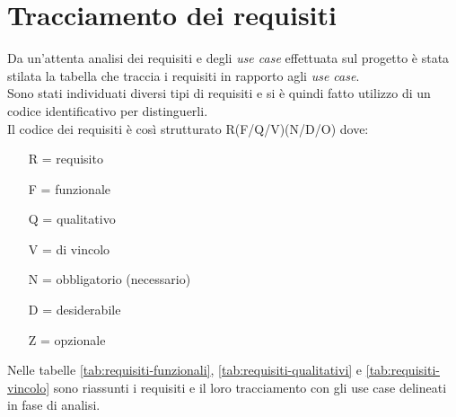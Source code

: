 \section{Tracciamento dei requisiti}
Da un'attenta analisi dei requisiti e degli \textit{use case} effettuata sul
progetto è
stata stilata la tabella che traccia i requisiti in rapporto agli \textit{use
    case}.\\
Sono stati individuati diversi tipi di requisiti e si è quindi fatto utilizzo
di un codice identificativo per distinguerli.\\
Il codice dei requisiti è così strutturato R(F/Q/V)(N/D/O) dove:
\begin{enumerate}[nolistsep]
    \item[R =] requisito
    \item[F =] funzionale
    \item[Q =] qualitativo
    \item[V =] di vincolo
    \item[N =] obbligatorio (necessario)
    \item[D =] desiderabile
    \item[Z =] opzionale
\end{enumerate}
Nelle tabelle \ref{tab:requisiti-funzionali}, \ref{tab:requisiti-qualitativi} e
\ref{tab:requisiti-vincolo} sono riassunti i requisiti e il loro tracciamento
con gli use case delineati in fase di analisi.



